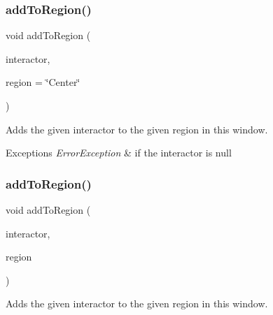 \subsubsection{\texorpdfstring{add\+To\+Region()}{addToRegion()}\hspace{0.1cm}{\footnotesize\ttfamily [2/4]}}
{\footnotesize\ttfamily void add\+To\+Region (\begin{DoxyParamCaption}\item[{\mbox{\hyperlink{classGInteractor}{G\+Interactor}} $\ast$}]{interactor,  }\item[{const std\+::string \&}]{region = {\ttfamily \char`\"{}Center\char`\"{}} }\end{DoxyParamCaption})\hspace{0.3cm}{\ttfamily [virtual]}}



Adds the given interactor to the given region in this window. 


\begin{DoxyExceptions}{Exceptions}
{\em Error\+Exception} & if the interactor is null \\
\hline
\end{DoxyExceptions}
\mbox{\label{classGWindow_ad05df0d92ab2fba95d401a5614365558}} 
\subsubsection{\texorpdfstring{add\+To\+Region()}{addToRegion()}\hspace{0.1cm}{\footnotesize\ttfamily [3/4]}}
{\footnotesize\ttfamily void add\+To\+Region (\begin{DoxyParamCaption}\item[{\mbox{\hyperlink{classGInteractor}{G\+Interactor}} \&}]{interactor,  }\item[{\mbox{\hyperlink{classGWindow_a81a01a86de31071a92e6cce0bab9bc4b}{Region}}}]{region }\end{DoxyParamCaption})\hspace{0.3cm}{\ttfamily [virtual]}}



Adds the given interactor to the given region in this window. 

\mbox{\label{classGWindow_a667ed0065e0bbb52a893904e7f2383bb}} 
